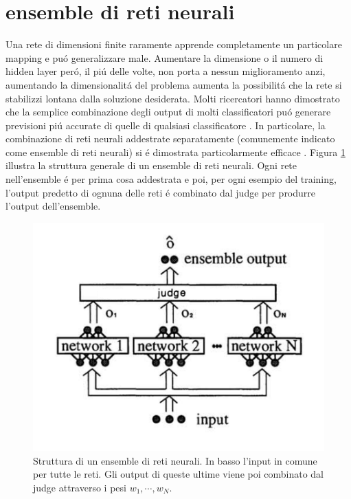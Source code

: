 \documentclass[a4paper,12pt]{report}
\begin{document}
 \section{ensemble di reti neurali}
 Una rete di dimensioni finite raramente apprende completamente un particolare mapping e pu\'o generalizzare male. Aumentare la dimensione o il numero di hidden layer per\'o, il pi\'u delle volte, non porta a nessun miglioramento \cite{soulie1987evaluation} anzi, aumentando la dimensionalit\'a del problema aumenta la possibilit\'a che la rete si stabilizzi lontana dalla soluzione desiderata. 
 Molti ricercatori hanno dimostrato che la semplice combinazione degli output di molti classificatori pu\'o generare previsioni pi\'u accurate di quelle di qualsiasi classificatore \cite{clemen1989combining} \cite{wolpert1992stacked}. In particolare, la combinazione di reti neurali addestrate separatamente (comunemente indicato come ensemble di reti neurali) si \'e dimostrata particolarmente efficace \cite{alpaydin1993multiple} \cite{drucker1994boosting} \cite{krogh1995neural} \cite{maclin1995combining} \cite{perrone1992soft}. 
 Figura \ref{EnsembleStructurepng} illustra la struttura generale di un ensemble di reti neurali. Ogni rete nell'ensemble \'e per prima cosa addestrata e poi, per ogni esempio del training, l'output predetto di ognuna delle reti \'e combinato dal judge per produrre l'output dell'ensemble. 
 \begin{figure}[h!]
  \centering
  \includegraphics[scale=0.4]{EnsembleStructure.png}
  \caption{Struttura di un ensemble di reti neurali. In basso l'input in comune per tutte le reti. Gli output di queste ultime viene poi combinato dal judge attraverso i pesi $w_1, \cdots , w_N$.}
  \label{EnsembleStructurepng}
 \end{figure}
 
\end{document}
